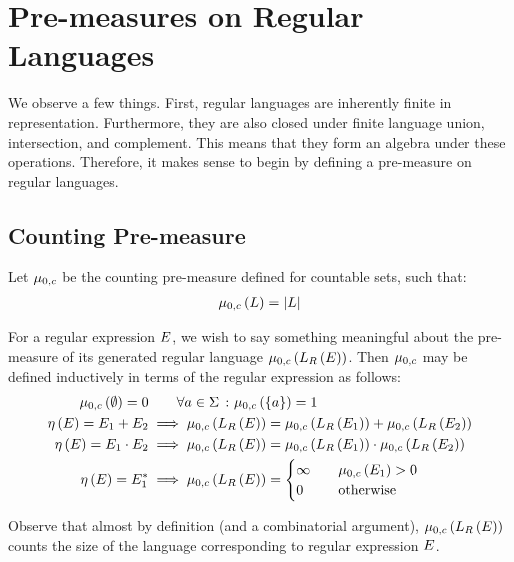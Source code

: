\section{Pre-measures on Regular Languages}
We observe a few things.
First, regular languages are inherently finite in representation.
Furthermore, they are also closed under finite language union,
intersection, and complement.
This means that they form an algebra under these operations.
Therefore, it makes sense to begin by defining a pre-measure on
regular languages.

\subsection{Counting Pre-measure}
Let \(\mu_{0, c}\) be the counting pre-measure defined for countable sets,
such that:
\begin{align*}
  \mu_{0, c}\left(L\right) = \left\lvert L\right\rvert
\end{align*}

For a regular expression \(E\),
we wish to say something meaningful about the pre-measure of its
generated regular language
\(\mu_{0, c}\left(L_{R}\left(E\right)\right)\).
Then \(\mu_{0, c}\) may be defined inductively in terms of
the regular expression as follows:
\begin{align*}
  \mu_{0, c}\left(\emptyset\right) = 0
    &\qquad \forall a \in \Sigma \ \colon \mu_{0, c}\left(\left\{a\right\}\right) = 1 \\
  \eta\left(E\right) = E_1 + E_2
    &\implies
      \mu_{0, c}\left(L_{R}\left(E\right)\right) =
        \mu_{0, c}\left(L_{R}\left(E_1\right)\right) +
        \mu_{0, c}\left(L_{R}\left(E_2\right)\right) \\
  \eta\left(E\right) = E_1 \cdot E_2
    &\implies
      \mu_{0, c}\left(L_{R}\left(E\right)\right) =
        \mu_{0, c}\left(L_{R}\left(E_1\right)\right) \cdot
        \mu_{0, c}\left(L_{R}\left(E_2\right)\right) \\
  \eta\left(E\right) = E_1 ^\ast
    &\implies
      \mu_{0, c}\left(L_{R}\left(E\right)\right)
        = \begin{cases}
            \infty & \quad \mu_{0, c}\left(E_1\right) > 0 \\
            0 & \quad \text{otherwise}
          \end{cases}
\end{align*}

Observe that almost by definition (and a combinatorial argument),
\(\mu_{0, c}\left(L_{R}\left(E\right)\right)\) counts the size of
the language corresponding to regular expression \(E\).

